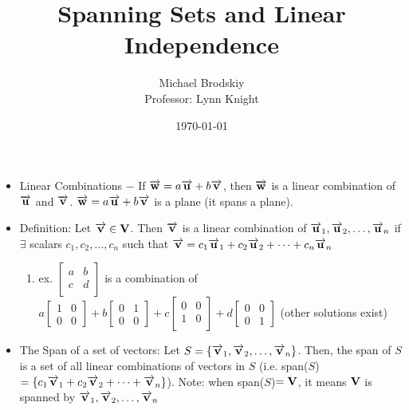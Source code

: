 \documentclass[12pt]{article}
\title{Spanning Sets and Linear Independence}
\date{\today}
\author{Michael Brodskiy\\ \small Professor: Lynn Knight}
\begin{document}
\maketitle

\begin{itemize}

  \item Linear Combinations $-$ If $\overrightarrow{\bold{w}}=a\overrightarrow{\bold{u}}+b\overrightarrow{\bold{v}}$, then $\overrightarrow{\bold{w}}$ is a linear combination of $\overrightarrow{\bold{u}}$ and $\overrightarrow{\bold{v}}$. $\overrightarrow{\bold{w}}=a\overrightarrow{\bold{u}}+b\overrightarrow{\bold{v}}$ is a plane (it spans a plane).

  \item Definition: Let $\overrightarrow{\bold{v}}\in\bold{V}$. Then $\overrightarrow{\bold{v}}$ is a linear combination of $\overrightarrow{\bold{u}}_1, \overrightarrow{\bold{u}}_2, \dots,\overrightarrow{\bold{u}}_n$ if $\exists$ scalars $c_1,c_2,\dots,c_n$ such that $\overrightarrow{\bold{v}}=c_1\overrightarrow{\bold{u}}_1+c_2\overrightarrow{\bold{u}}_2+\dots+c_n\overrightarrow{\bold{u}}_n$

    \begin{enumerate}

      \item ex. $\left[ \begin{array}{cc} a & b\\ c & d\\ \end{array}\right]$ is a combination of $a\left[ \begin{array}{cc} 1 & 0\\ 0 & 0  \end{array} \right]+b\left[ \begin{array}{cc} 0 & 1\\ 0 & 0  \end{array} \right]+c\left[ \begin{array}{cc} 0 & 0\\ 1 & 0\\ \end{array}\right] + d\left[ \begin{array}{cc} 0 & 0\\ 0 & 1 \end{array}\right]$ (other solutions exist)

    \end{enumerate}

  \item The Span of a set of vectors: Let $S=\left\{ \overrightarrow{\bold{v}}_1,\overrightarrow{\bold{v}}_2,\dots,\overrightarrow{\bold{v}}_n \right\}$. Then, the span of $S$ is a set of all linear combinations of vectors in $S$ (i.e. span($S$)$=\left\{ c_1\overrightarrow{\bold{v}}_1+c_2\overrightarrow{\bold{v}}_2+\dots+\overrightarrow{\bold{v}}_n \right\}$). Note: when span($S$)$=\bold{V}$, it means $\bold{V}$ is spanned by $\overrightarrow{\bold{v}}_1,\overrightarrow{\bold{v}}_2,\dots,\overrightarrow{\bold{v}}_n$


\end{itemize}
\end{document}
